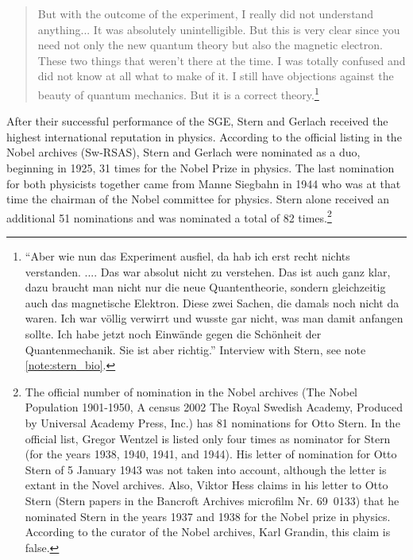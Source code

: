 \documentclass{article}
\begin{document}
\begin{quote}
But with the outcome of the experiment, I really did not understand anything... It was absolutely unintelligible. But this is very clear since you need not only the new quantum theory but also the magnetic electron. These two things that weren't there at the time. I was totally confused and did not know at all what to make of it. I still have objections against the beauty of quantum mechanics. But it is a correct theory.\footnote{``Aber wie nun das Experiment ausfiel, da hab ich erst recht nichts verstanden. .... Das war absolut nicht zu verstehen. Das ist auch ganz klar, dazu braucht man nicht nur die neue Quantentheorie, sondern gleichzeitig auch das magnetische Elektron. Diese zwei Sachen, die damals noch nicht da waren. Ich war völlig verwirrt und wusste gar nicht, was man damit anfangen sollte. Ich habe jetzt noch Einwände gegen die Schönheit der Quantenmechanik. Sie ist aber richtig.'' Interview with Stern, see note \ref{note:stern_bio}.}
\end{quote}

After their successful performance of the SGE, Stern and Gerlach received the highest international reputation in physics. According to the official listing in the Nobel archives  (Sw-RSAS), Stern and Gerlach were nominated as a duo, beginning in 1925, 31 times for the Nobel Prize in physics. The last nomination for both physicists together came from Manne Siegbahn in 1944 who was at that time the chairman of the Nobel committee for physics.  Stern alone received an additional 51 nominations and was nominated a total of 82 times.\footnote{The official number of nomination in the Nobel archives (The Nobel Population 1901-1950, A census 2002 The Royal Swedish Academy, Produced by Universal Academy Press, Inc.) 
has 81 nominations for Otto Stern. In the official list, Gregor Wentzel is  listed only four times as nominator for Stern (for the years 1938, 1940, 1941, and 1944). His letter of nomination for Otto Stern of 5 January 1943 was not taken into account, although the letter is extant in the Novel archives. Also, Viktor Hess claims in his letter to Otto Stern (Stern papers in the Bancroft Archives microfilm Nr. 69~0133) that he nominated Stern in the years 1937 and 1938 for the Nobel prize in physics. According to the curator of the Nobel archives, Karl Grandin, this claim is false.}
\end{document}
